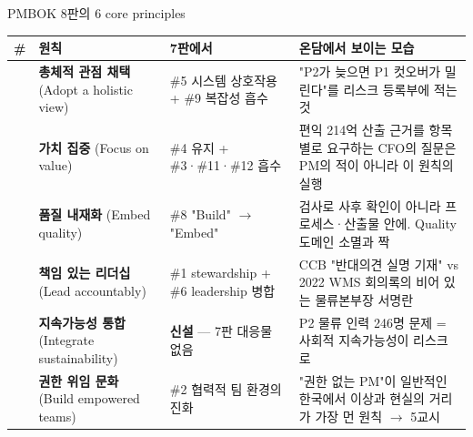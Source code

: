 \begin{frame}[allowframebreaks=1.0]{PMBOK 8판의 6 core principles}
\small
{\footnotesize\setlength{\tabcolsep}{3pt}\renewcommand{\arraystretch}{1.12}
\begin{tabular}{@{}>{\raggedright\arraybackslash}p{}>{\raggedright\arraybackslash}p{}>{\raggedright\arraybackslash}p{}>{\raggedright\arraybackslash}p{}@{}}
\toprule
\textbf{\#} & \textbf{원칙} & \textbf{7판에서} & \textbf{온담에서 보이는 모습} \\
\midrule
1 & \textbf{총체적 관점 채택} (Adopt a holistic view) & \#5 시스템 상호작용 + \#9 복잡성 흡수 & "P2가 늦으면 P1 컷오버가 밀린다"를 리스크 등록부에 적는 것 \\
2 & \textbf{가치 집중} (Focus on value) & \#4 유지 + \#3·\#11·\#12 흡수 & 편익 214억 산출 근거를 항목별로 요구하는 CFO의 질문은 PM의 적이 아니라 이 원칙의 실행 \\
3 & \textbf{품질 내재화} (Embed quality) & \#8 "Build" $\rightarrow$ "Embed" & 검사로 사후 확인이 아니라 프로세스·산출물 안에. Quality 도메인 소멸과 짝 \\
4 & \textbf{책임 있는 리더십} (Lead accountably) & \#1 stewardship + \#6 leadership 병합 & CCB "반대의견 실명 기재" vs 2022 WMS 회의록의 비어 있는 물류본부장 서명란 \\
5 & \textbf{지속가능성 통합} (Integrate sustainability) & \textbf{신설} — 7판 대응물 없음 & P2 물류 인력 246명 문제 = 사회적 지속가능성이 리스크로 \\
6 & \textbf{권한 위임 문화} (Build empowered teams) & \#2 협력적 팀 환경의 진화 & "권한 없는 PM"이 일반적인 한국에서 이상과 현실의 거리가 가장 먼 원칙 $\rightarrow$ 5교시 \\
\bottomrule
\end{tabular}}
\par\smallskip
{}
\end{frame}

